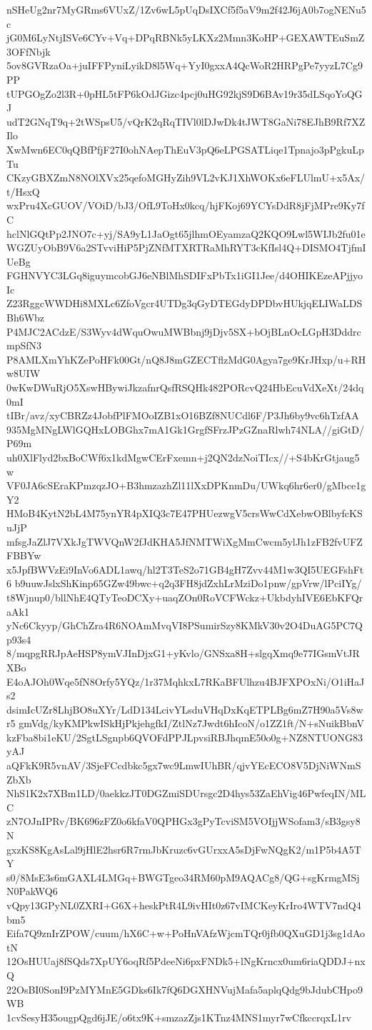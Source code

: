 nSHeUg2nr7MyGRms6VUxZ/1Zv6wL5pUqDsIXCf5f5aV9m2f42J6jA0b7ogNENu5c
jG0M6LyNtjISVe6CYv+Vq+DPqRBNk5yLKXz2Mmn3KoHP+GEXAWTEuSmZ3OFfNbjk
5ov8GVRzaOa+juIFFPyniLyikD8l5Wq+YyI0gxxA4QcWoR2HRPgPe7yyzL7Cg9PP
tUPGOgZo2l3R+0pHL5tFP6kOdJGizc4pcj0uHG92kjS9D6BAv19r35dLSqoYoQGJ
udT2GNqT9q+2tWSpsU5/vQrK2qRqTIVl0lDJwDk4tJWT8GaNi78EJhB9Rf7XZIlo
XwMwn6EC0qQBfPfjF27I0ohNAepThEuV3pQ6eLPGSATLiqe1Tpnajo3pPgkuLpTu
CKzyGBXZmN8NOlXVx25qefoMGHyZih9VL2vKJ1XhWOKx6eFLUlmU+x5Ax/t/HsxQ
wxPru4XcGUOV/VOiD/bJ3/OfL9ToHx0kcq/hjFKoj69YCYsDdR8jFjMPre9Ky7fC
hclNlGQtPp2JNO7c+yj/SA9yL1JaOgt65jlhmOEyamzaQ2KQO9Lwl5WIJb2fu01e
WGZUyObB9V6a2STvviHiP5PjZNfMTXRTRaMhRYT3cKfIsl4Q+DISMO4TjfmIUeBg
FGHNVYC3LGq8iguymcobGJ6eNBlMhSDIFxPbTx1iGI1Jee/d4OHIKEzeAPjjyoIc
Z23RggcWWDHi8MXLc6ZfoVgcr4UTDg3qGyDTEGdyDPDbvHUkjqELIWaLDSBh6Wbz
P4MJC2ACdzE/S3Wyv4dWquOwuMWBbnj9jDjv5SX+bOjBLnOcLGpH3DddrcmpSfN3
P8AMLXmYhKZePoHFk00Gt/nQ8J8mGZECTflzMdG0Agya7ge9KrJHxp/u+RHw8UIW
0wKwDWuRjO5XswHBywiJkzafnrQsfRSQHk482PORcvQ24HbEcuVdXeXt/24dq0mI
tIBr/avz/xyCBRZz4JobfPlFMOoIZB1xO16BZf8NUCdl6F/P3Jh6by9vc6hTzfAA
935MgMNgLWlGQHxLOBGhx7mA1Gk1GrgfSFrzJPzGZnaRlwh74NLA//giGtD/P69m
uh0XlFlyd2bxBoCWf6x1kdMgwCErFxemn+j2QN2dzNoiTIcx//+S4bKrGtjaug5w
VF0JA6cSEraKPmzqzJO+B3hmzazhZl11lXxDPKnmDu/UWkq6hr6er0/gMbce1gY2
HMoB4KytN2bL4M75ynYR4pXIQ3c7E47PHUezwgV5crsWwCdXebwOBlbyfcKSuJjP
mfsgJaZlJ7VXkJgTWVQnW2fJdKHA5JfNMTWiXgMmCwcm5ylJh1zFB2fvUFZFBBYw
x5JpfBWVzEi9InVo6ADL1awq/hl2T3TeS2o71GB4gH7Zvv44M1w3QI5UEGFshFt6
b9uuwJslxShKinp65GZw49bwc+q2q3FH8jdZxhLrMziDo1pnw/gpVrw/lPciIYg/
t8Wjnup0/bllNhE4QTyTeoDCXy+uaqZOn0RoVCFWckz+UkbdyhIVE6EbKFQraAk1
yNc6Ckyyp/GhChZra4R6NOAmMvqVI8PSumirSzy8KMkV30v2O4DuAG5PC7Qp93s4
8/mqpgRRJpAeHSP8ymVJInDjxG1+yKvlo/GNSxa8H+slgqXmq9e77IGsmVtJRXBo
E4oAJOh0Wqe5fN8Orfy5YQz/1r37MqhkxL7RKaBFUlhzu4BJFXPOxNi/O1iHaJs2
dsimIcUZr8LhjBO8uXYr/LdD134LcivYLsduVHqDxKqETPLBg6mZ7H90a5Vs8wr5
gmVdg/kyKMPkwISkHjPkjehgfkI/ZtlNz7Jwdt6hIcoN/o1ZZ1ft/N+sNuikBbnV
kzFba8bi1eKU/2SgtLSgnpb6QVOFdPPJLpvsiRBJhqmE50o0g+NZ8NTUONG83yAJ
aQFkK9R5vnAV/3SjeFCcdbkc5gx7wc9LmwIUhBR/qjvYEcECO8V5DjNiWNmSZbXb
NhS1K2x7XBm1LD/0aekkzJT0DGZmiSDUrsgc2D4hys53ZaEhVig46PwfeqIN/MLC
zN7OJnIPRv/BK696zFZ0o6kfaV0QPHGx3gPyTcviSM5VOIjjWSofam3/sB3gsy8N
gxzKS8KgAsLal9jHlE2hsr6R7rmJbKruzc6vGUrxxA5sDjFwNQgK2/m1P5b4A5TY
s0/8MsE3s6mGAXL4LMGq+BWGTgeo34RM60pM9AQACg8/QG+sgKrmgMSjN0PakWQ6
vQpy13GPyNL0ZXRI+G6X+heskPtR4L9ivHIt0z67vIMCKeyKrIro4WTV7ndQ4bm5
Eifa7Q9znIrZPOW/cuum/hX6C+w+PoHnVAfzWjcmTQr0jfb0QXuGD1j3sg1dAotN
12OsHUUaj8fSQds7XpUY6oqRf5PdeeNi6pxFNDk5+lNgKrncx0um6riaQDDJ+nxQ
22OsBI0SonI9PzMYMnE5GDks6Ik7fQ6DGXHNVujMafa5aplqQdg9bJdubCHpo9WB
1cvSesyH35ougpQgd6jJE/o6tx9K+smzazZjs1KTnz4MNS1myr7wCfkccrqxL1rv
